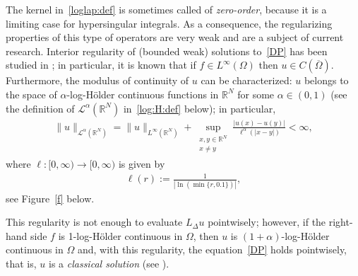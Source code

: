 \documentclass[11pt]{article}
\newcommand{\R}{\mathbb{R}}
\numberwithin{equation}{section}
\begin{document}
The kernel in~\eqref{loglap:def} is sometimes called of \emph{zero-order}, because it is a limiting case for hypersingular integrals.  As a consequence, the regularizing properties of this type of operators are very weak and are a subject of current research.  Interior regularity of (bounded weak) solutions to~\eqref{DP} has been studied in \cite{CW19,CS22,feulefack2021nonlocal,KM17}; in particular, it is known that if $f\in L^\infty(\Omega)$ then $u\in C(\overline{\Omega})$.  Furthermore, the modulus of continuity of $u$ can be characterized: $u$ belongs to the space of $\alpha$-log-Hölder continuous functions in $\R^N$ for some $\alpha\in(0,1)$ (see the definition of $\mathcal L^\alpha(\R^N)$ in~\eqref{log:H:def} below); in particular,
\begin{align}\label{reg:at:bdry}
 \|u\|_{\mathcal L^\alpha(\R^N)}=\|u\|_{L^\infty(\R^N)}+\sup_{\substack{x,y\in \R^N\\x\neq y}}\frac{|u(x)-u(y)|}{\ell^\alpha(|x-y|)}<\infty,
\end{align}
where $\ell:[0,\infty)\to[0,\infty)$ is given by 
\begin{align*}
\ell(r):=\frac{1}{|\ln(\min\{r,0.1\})|},    
\end{align*}
see Figure~\ref{f} below. 

This regularity is not enough to evaluate $L_\Delta u$ pointwisely; however, if the right-hand side $f$ is 1-log-Hölder continuous in $\Omega$, then $u$ is $(1+\alpha)$-log-Hölder continuous in $\Omega$ and, with this regularity, the equation~\eqref{DP} holds pointwisely, that is, $u$ is a \emph{classical solution} (see \cite[Theorem 1.1]{CS22}). 
\end{document}
